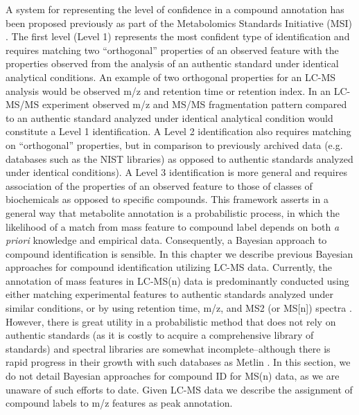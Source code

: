 \begin{DoubleSpace*}
A system for representing the level of confidence in a compound annotation has been proposed previously as part of the Metabolomics Standards Initiative (MSI) \cite{sumner2007}. The first level (Level 1) represents the most confident type of identification and requires matching two ``orthogonal'' properties of an observed feature with the properties observed from the analysis of an authentic standard under identical analytical conditions. An example of two orthogonal properties for an LC-MS analysis would be observed m/z and retention time or retention index. In an LC-MS/MS experiment observed m/z and MS/MS fragmentation pattern compared to an authentic standard analyzed under identical analytical condition would constitute a Level 1 identification.  A Level 2 identification also requires matching on ``orthogonal'' properties, but in comparison to previously archived data (e.g. databases such as the NIST libraries) as opposed to authentic standards analyzed under identical conditions). A Level 3 identification is more general and requires association of the properties of an observed feature to those of classes of biochemicals as opposed to specific compounds. This framework asserts in a general way that metabolite annotation is a probabilistic process, in which the likelihood of a match from mass feature to compound label depends on both \emph{a priori} knowledge and empirical data. Consequently, a Bayesian approach to compound identification is sensible. In this chapter we describe previous Bayesian approaches for compound identification utilizing LC-MS data. Currently, the annotation of mass features in LC-MS(n) data is predominantly conducted using either matching experimental features to authentic standards analyzed under similar conditions, or by using retention time, m/z, and MS2 (or MS[n]) spectra \cite{daly2014}. However, there is great utility in a probabilistic method that does not rely on authentic standards (as it is costly to acquire a comprehensive library of standards) and spectral libraries are somewhat incomplete--although there is rapid progress in their growth with such databases as Metlin \cite{smith2005,tautenhahn2012,guijas2018}. In this section, we do not detail Bayesian approaches for compound ID for MS(n) data, as we are unaware of such efforts to date. Given LC-MS data we describe the assignment of compound labels to m/z features as peak annotation. 


\end{DoubleSpace*}
